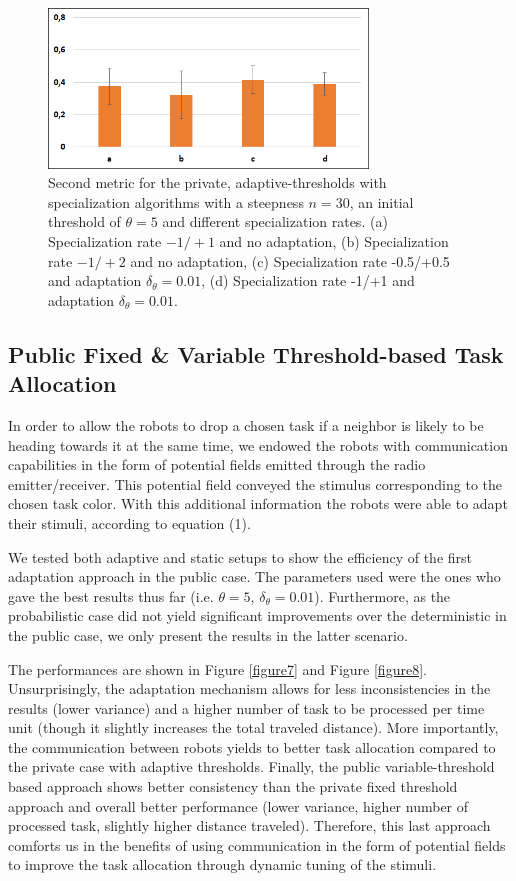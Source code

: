 	\begin{figure}[thpb]
      \centering
      \includegraphics[width=8.5cm]{Pictures/PrivSpecMetric2.png}
      \caption{Second metric for the private, adaptive-thresholds with specialization algorithms with a steepness $n=30$, an initial threshold of $\theta=5$ and different specialization rates. (a) Specialization rate $-1/+1$ and no adaptation, (b) Specialization rate $-1/+2$ and no adaptation, (c) Specialization rate -0.5/+0.5 and adaptation $\delta_{\theta}=0.01$, (d) Specialization rate -1/+1 and adaptation $\delta_{\theta}=0.01$.}
      \label{figure6}
   \end{figure}

\subsection{Public Fixed \& Variable Threshold-based Task Allocation}
In order to allow the robots to drop a chosen task if a neighbor is likely to be heading towards it at the same time, we endowed the robots with communication capabilities in the form of potential fields emitted through the radio emitter/receiver. This potential field conveyed the stimulus corresponding to the chosen task color. With this additional information the robots were able to adapt their stimuli, according to equation (1).

We tested both adaptive and static setups to show the efficiency of the first adaptation approach in the public case. The parameters used were the ones who gave the best results thus far (i.e. $\theta = 5$, $\delta_{\theta} = 0.01$). Furthermore, as the probabilistic case did not yield significant improvements over the deterministic in the public case, we only present the results in the latter scenario.

The performances are shown in Figure \ref{figure7} and Figure \ref{figure8}. Unsurprisingly, the adaptation mechanism allows for less inconsistencies in the results (lower variance) and a higher number of task to be processed per time unit (though it slightly increases the total traveled distance). More importantly, the communication between robots yields to better task allocation compared to the private case with adaptive thresholds. Finally, the public variable-threshold based approach shows better consistency than the private fixed threshold approach and overall better performance (lower variance, higher number of processed task, slightly higher distance traveled). Therefore, this last approach comforts us in the benefits of using communication in the form of potential fields to improve the task allocation through dynamic tuning of the stimuli.


